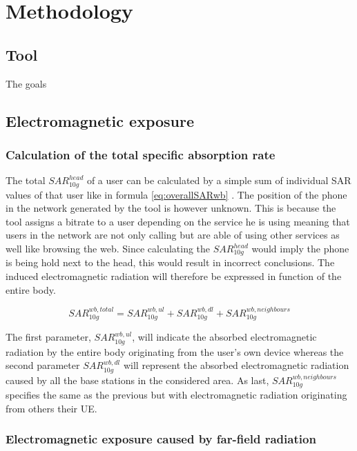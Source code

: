 \chapter{Methodology}
\label{chap:methodology}


\section{Tool}
The goals 
\section{Electromagnetic exposure}
\subsection{Calculation of the total specific absorption rate} %
\label{sub:Calculationexposure}

The total $SAR^{head}_{10g}$ of a user can be calculated by a simple sum of individual SAR values of that user like in formula \ref{eq:overallSARwb} \cite{J17_kuehn2019modelling}. 
The position of the phone in the network generated by the tool is however unknown. This is because the tool assigns a bitrate 
to a user depending on the service he is using
meaning that users in the network are not only calling but are able of using other services as well like browsing the web. 
Since calculating the $SAR^{head}_{10g}$ would imply the phone is being hold next to the head, this would result in incorrect conclusions.
The induced electromagnetic radiation will therefore be expressed in function of the entire body.


\begin{equation} 
SAR^{wb,total}_{10g} = SAR^{wb,ul}_{10g} +  SAR^{wb,dl}_{10g} + SAR^{wb,neighbours}_{10g}
\label{eq:overallSARwb}
\end{equation}

The first parameter, $SAR^{wb,ul}_{10g}$, will indicate the absorbed electromagnetic radiation by the entire body originating from the user's own device
whereas the second parameter $SAR^{wb,dl}_{10g}$ will represent the absorbed electromagnetic radiation caused by all the base stations in the considered area.
As last, $SAR^{wb,neighbours}_{10g} $ specifies the same as the previous but with electromagnetic radiation originating from others their \gls{UE}.

\subsection{Electromagnetic exposure caused by far-field radiation} %
\label{sub:Calculatingdownlinkexpsure}

